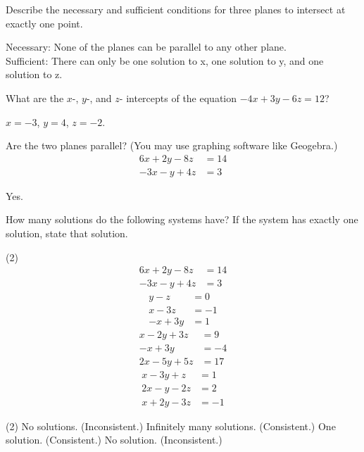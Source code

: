 \documentclass[12pt,fleqn]{book}
\newcommand{\prb}[1]{\begin{Exercise}#1\end{Exercise}}
\newcommand{\sol}[1]{\begin{Answer}#1\end{Answer}}
\begin{document}
\vfill
\prb{
	Describe the necessary and sufficient conditions for three planes to intersect at exactly one point.
}
\sol{Necessary: None of the planes can be parallel to any other plane. \\
	Sufficient: There can only be one solution to x, one solution to y, and one solution to z.}
    \vfill 
\prb{
	What are the $x$-, $y$-, and $z$- intercepts of the equation $-4x+3y-6z=12$?
}
\sol{$x=-3$, $y=4$, $z=-2$.}
\vfill
\prb{Are the two planes parallel? (You may use graphing software like Geogebra.)
	\begin{align*}
		6x+2y-8z & =14 \\
		-3x-y+4z & =3
	\end{align*}
}
\sol{Yes.}
\vfill
\prb{How many solutions do the following systems have?  If the system has exactly one solution, state that solution.
	\begin{tasks}(2)
		\task \vspace{-2.4em}
		\begin{align*}
			6x+2y-8z & =14 \\
			-3x-y+4z & =3
		\end{align*}
		\task \vspace{-2.4em}
		\begin{align*}
			y-z   & =0  \\
			x-3z  & =-1 \\
			-x+3y & =1
		\end{align*}
		\task \vspace{-2.4em}
		\begin{align*}
			x-2y+3z  & =9   \\
			-x+3y    & = -4 \\
			2x-5y+5z & =17
		\end{align*}
		\task \vspace{-2.4em}
		\begin{align*}
			x-3y+z  & =1  \\
			2x-y-2z & =2  \\
			x+2y-3z & =-1
		\end{align*}
	\end{tasks}
}
\sol{
	\begin{tasks}(2)
		\task No solutions. (Inconsistent.)
		\task Infinitely many solutions. (Consistent.)
		\task One solution. (Consistent.)
		\task No solution. (Inconsistent.)
	\end{tasks}\clearpage
}
\vfill
\end{document}
